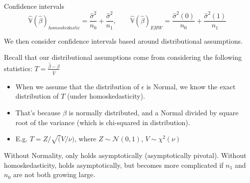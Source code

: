 \documentclass[notes,11pt, aspectratio=169]{beamer}
\newenvironment{wideitemize}{\itemize\addtolength{\itemsep}{10pt}}{\enditemize}
\begin{document}
\begin{frame}{Confidence intervals}
  \begin{equation*}
    \hat{\mathbb{V}}(\hat{\beta})_{homoskedastic} = \frac{\hat{\sigma}^{2}}{n_{0}} + \frac{\hat{\sigma}^{2}}{n_{1}}, \qquad \hat{\mathbb{V}}(\hat{\beta})_{EHW} = \frac{\hat{\sigma}^{2}(0)}{n_{0}} + \frac{\hat{\sigma}^{2}(1)}{n_{1}}
  \end{equation*}
  \begin{wideitemize}
  \item We then consider confidence intervals based around distributional assumptions.
    \item Recall that our distributional assumptions come from considering the following statistics: $T = \frac{\hat{\beta} - \beta}{\hat{V}}$    
    \begin{itemize}
    \item When we assume that the distribution of $\epsilon$ is
      Normal, we know the exact distribution of $T$ (under
      homoskedasticity).
    \item That's because $\beta$ is normally
      distributed, and a Normal divided by square root of the
      variance (which is chi-squared in distribution).
    \item E.g. $T = Z / \sqrt(V/\nu)$, where $Z \sim \mathcal{N}(0,1)$, $V \sim \chi^{2}(\nu)$
    \end{itemize}
  \item Without Normality, only holds asymptotically (asymptotically
      pivotal). Without homoskedasticity, holds asymptotically, but
      becomes more complicated if $n_{1}$ and $n_{0}$ are not both
      growing large.
  \end{wideitemize}
\end{frame}
\end{document}
